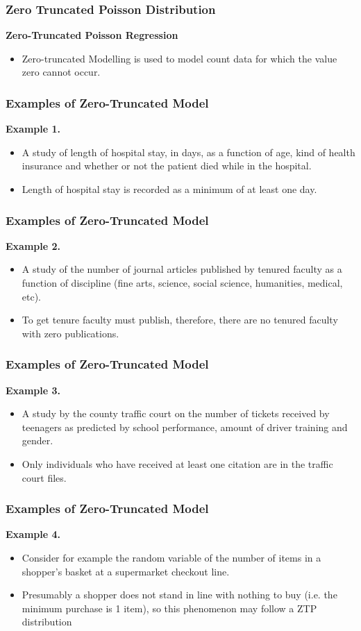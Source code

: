 \documentclass[MASTER.tex]{subfiles}
\begin{document}
	\begin{frame}
		\frametitle{Zero Truncated Poisson Distribution}
		\Large
		\textbf{Zero-Truncated Poisson Regression}
		\begin{itemize}
		\item Zero-truncated Modelling is used to model count data for which the value zero cannot occur.
		\end{itemize}
		
		\end{frame}
\begin{frame}
	\frametitle{Examples of Zero-Truncated Model}
	\textbf{Example 1.}
	\begin{itemize}
		\item A study of length of hospital stay, in days, as a function of age, kind of health insurance and whether or not the patient died while in the hospital. 
		\item Length of hospital stay is recorded as a minimum of at least one day.
	\end{itemize}
\end{frame}
\begin{frame}
	\frametitle{Examples of Zero-Truncated Model}
	\textbf{Example 2.}
	\begin{itemize} 
		\item A study of the number of journal articles published by tenured faculty as a function of discipline (fine arts, science, social science, humanities, medical, etc).
		\item To get tenure faculty must publish, therefore, there are no tenured faculty with zero publications.
	\end{itemize}
\end{frame}
\begin{frame}
	\frametitle{Examples of Zero-Truncated Model}
	\textbf{Example 3.}
	\begin{itemize} 
		\item A study by the county traffic court on the number of tickets received by teenagers as predicted by school performance, amount of driver training and gender.
		\item Only individuals who have received at least one citation are in the traffic court files.
	\end{itemize}
\end{frame}
\begin{frame}
	\frametitle{Examples of Zero-Truncated Model}
	\textbf{Example 4.}
\begin{itemize}
	\item 
Consider for example the random variable of the number of items in a shopper's basket at a supermarket checkout line. 
\item Presumably a shopper does not stand in line with nothing to buy (i.e. the minimum purchase is 1 item), so this phenomenon may follow a ZTP distribution
	\end{itemize}
\end{frame}
\end{document}
